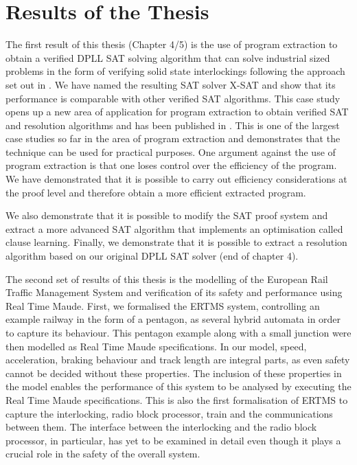 \section{Results of the Thesis}
 

The first result of this thesis (Chapter 4/5) is the use of program extraction to obtain a verified DPLL SAT solving algorithm that can solve industrial sized problems in the form of verifying solid state interlockings following the approach set out in \cite{AL14a}. We have named the resulting SAT solver X-SAT and show that its performance is comparable with other verified SAT algorithms. This case study opens up a new area of application for program extraction to obtain verified SAT and resolution algorithms and has been published in \cite{AL12,AL14b}. This is one of the largest case studies so far in the area of program extraction and demonstrates that the technique can be used for practical purposes.  One argument against the use of program extraction is that one loses control over the efficiency of the program. We have demonstrated that it is possible to carry out efficiency considerations at the proof level and therefore obtain a more efficient extracted program. 

We also demonstrate that it is possible to modify the SAT proof system and extract a more advanced SAT algorithm that implements an optimisation called clause learning. Finally, we demonstrate that it is possible to extract a resolution algorithm based on our original DPLL SAT solver (end of chapter 4).


The second set of  results of this thesis is the modelling of the European Rail Traffic Management System and verification of its safety and performance using Real Time Maude. First, we formalised the ERTMS system, controlling an example railway in the form of a pentagon, as several hybrid automata in order to capture its behaviour.  This pentagon example along with a small junction were then modelled as Real Time Maude specifications. In our model, speed, acceleration, braking behaviour and track length are integral parts, as even safety cannot be decided without these properties. The inclusion of these properties in the model enables the performance of this system to be analysed by executing the Real Time Maude specifications. This is also the first formalisation of ERTMS to capture the interlocking, radio block processor, train and the communications between them. The interface between the interlocking and the radio block processor, in particular, has yet to be examined in detail even though it plays a crucial role in the safety of the overall system.


